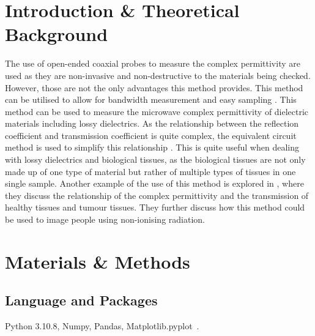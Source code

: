 \documentclass[12pt, a4paper]{article}
\begin{document}
\begin{multicols*}{2}

\section{Introduction \& Theoretical Background}
The use of open-ended coaxial probes to measure the complex permittivity are used as they are non-invasive and non-destructive to the materials being checked. However, those are not the only advantages this method provides. This method can be utilised to allow for bandwidth measurement and easy sampling \parencite{liao2011accurate}. This method can be used to measure the microwave complex permittivity of dielectric materials including lossy dielectrics. As the relationship between the reflection coefficient and transmission coefficient is quite complex, the equivalent circuit method is used to simplify this relationship \parencite{stuchly1982equivalent}. This is quite useful when dealing with lossy dielectrics and biological tissues, as the biological tissues are not only made up of one type of material but rather of multiple types of tissues in one single sample. Another example of the use of this method is explored in \cite{zajivcek2006evaluation}, where they discuss the relationship of the complex permittivity and the transmission of healthy tissues and tumour tissues. They further discuss how this method could be used to image people using non-ionising radiation.

\section{Materials \& Methods}
\subsection{Language and Packages}
Python 3.10.8, Numpy, Pandas, Matplotlib.pyplot \,.

\end{multicols*}
\end{document}
